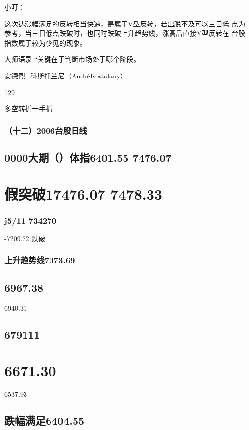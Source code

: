 \documentclass{article}
\begin{document}
小叮：

这次达涨幅满足的反转相当快速，是属于V型反转，若出脱不及可以三日低 点为参考，当三日低点跌破时，也同时跌破上升趋势线，涨高后直接V型反转在 台股指数属于较为少见的现象。

大师语录 “关键在于判断市场处于哪个阶段。

安德烈·科斯托兰尼（AndréKostolany）

129

\clearpage

多空转折一手抓

\subsubsection{（十二）2006台股日线}

\subsection{0000大期（）体指6401.55 7476.07}

\section{假突破17476.07 7478.33}

\subsubsection{j5/11 734270}

-7209.32 跌破

\subsubsection{上升趋势线7073.69}

\subsection{6967.38}

6940.31

\subsection{679111}

\section{6671.30}

6537.93

\subsection{跌幅满足6404.55}
\end{document}
